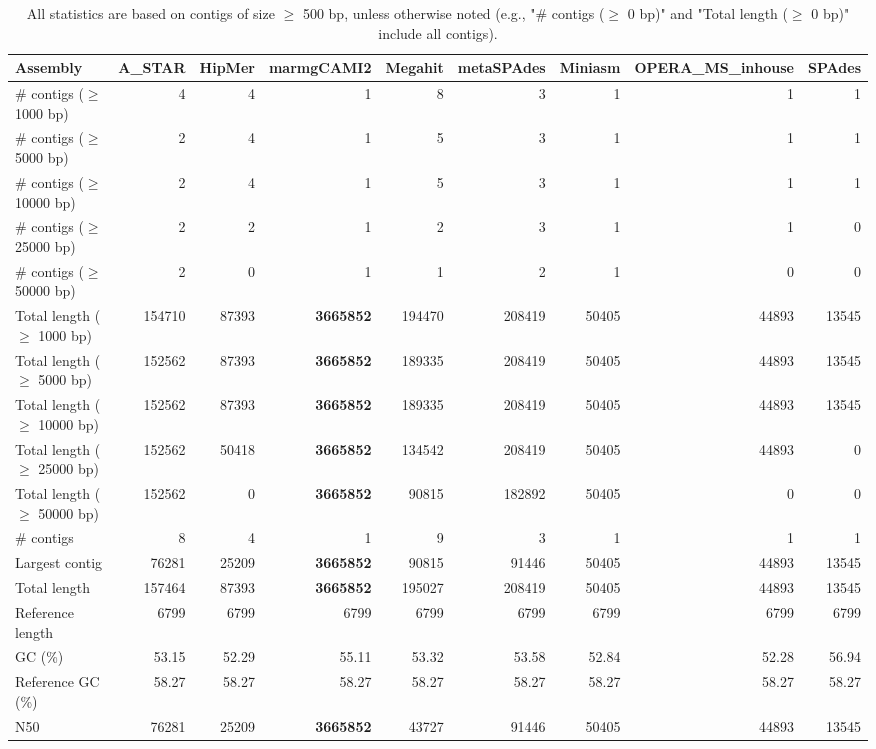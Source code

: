 \documentclass[12pt,a4paper]{article}
\begin{document}
\begin{table}[ht]
\begin{center}
\caption{All statistics are based on contigs of size $\geq$ 500 bp, unless otherwise noted (e.g., "\# contigs ($\geq$ 0 bp)" and "Total length ($\geq$ 0 bp)" include all contigs).}
\begin{tabular}{|l*{8}{|r}|}
\hline
Assembly & A\_STAR & HipMer & marmgCAMI2 & Megahit & metaSPAdes & Miniasm & OPERA\_MS\_inhouse & SPAdes \\ \hline
\# contigs ($\geq$ 1000 bp) & 4 & 4 & 1 & 8 & 3 & 1 & 1 & 1 \\ \hline
\# contigs ($\geq$ 5000 bp) & 2 & 4 & 1 & 5 & 3 & 1 & 1 & 1 \\ \hline
\# contigs ($\geq$ 10000 bp) & 2 & 4 & 1 & 5 & 3 & 1 & 1 & 1 \\ \hline
\# contigs ($\geq$ 25000 bp) & 2 & 2 & 1 & 2 & 3 & 1 & 1 & 0 \\ \hline
\# contigs ($\geq$ 50000 bp) & 2 & 0 & 1 & 1 & 2 & 1 & 0 & 0 \\ \hline
Total length ($\geq$ 1000 bp) & 154710 & 87393 & {\bf 3665852} & 194470 & 208419 & 50405 & 44893 & 13545 \\ \hline
Total length ($\geq$ 5000 bp) & 152562 & 87393 & {\bf 3665852} & 189335 & 208419 & 50405 & 44893 & 13545 \\ \hline
Total length ($\geq$ 10000 bp) & 152562 & 87393 & {\bf 3665852} & 189335 & 208419 & 50405 & 44893 & 13545 \\ \hline
Total length ($\geq$ 25000 bp) & 152562 & 50418 & {\bf 3665852} & 134542 & 208419 & 50405 & 44893 & 0 \\ \hline
Total length ($\geq$ 50000 bp) & 152562 & 0 & {\bf 3665852} & 90815 & 182892 & 50405 & 0 & 0 \\ \hline
\# contigs & 8 & 4 & 1 & 9 & 3 & 1 & 1 & 1 \\ \hline
Largest contig & 76281 & 25209 & {\bf 3665852} & 90815 & 91446 & 50405 & 44893 & 13545 \\ \hline
Total length & 157464 & 87393 & {\bf 3665852} & 195027 & 208419 & 50405 & 44893 & 13545 \\ \hline
Reference length & 6799 & 6799 & 6799 & 6799 & 6799 & 6799 & 6799 & 6799 \\ \hline
GC (\%) & 53.15 & 52.29 & 55.11 & 53.32 & 53.58 & 52.84 & 52.28 & 56.94 \\ \hline
Reference GC (\%) & 58.27 & 58.27 & 58.27 & 58.27 & 58.27 & 58.27 & 58.27 & 58.27 \\ \hline
N50 & 76281 & 25209 & {\bf 3665852} & 43727 & 91446 & 50405 & 44893 & 13545 \\ \hline

\end{tabular}
\end{center}
\end{table}
\end{document}
